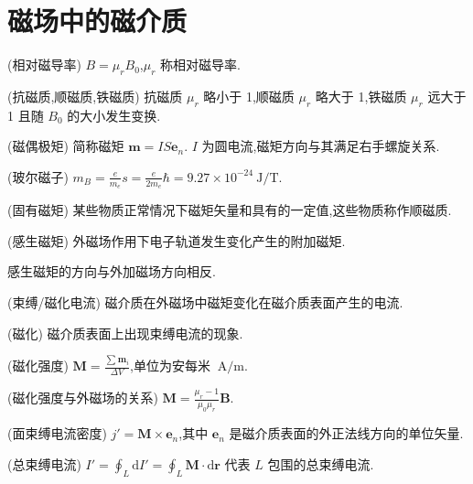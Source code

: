     \section{磁场中的磁介质}
    \begin{definition}
        (相对磁导率) $B=\mu_{r}B_0$,$\mu_{r}$ 称相对磁导率.
    \end{definition}
    \begin{definition}
        (抗磁质,顺磁质,铁磁质) 抗磁质 $\mu_{r}$ 略小于 1,顺磁质 $\mu_{r}$ 略大于 1,铁磁质 $\mu_{r}$ 远大于 1 且随 $B_0$ 的大小发生变换.
    \end{definition}
    \begin{definition}
        (磁偶极矩) 简称磁矩 $\bm{m}=IS\bm{e}_{n}$. $I$ 为圆电流,磁矩方向与其满足右手螺旋关系.
    \end{definition}
    \begin{definition}
        (玻尔磁子) $m_{B}=\frac{e}{m_{e}}s=\frac{e}{2m_{e}}\hbar =9.27\times 10^{-24} \ \mathrm{J / T}$.
    \end{definition}
    \begin{definition}
        (固有磁矩) 某些物质正常情况下磁矩矢量和具有的一定值,这些物质称作顺磁质.
    \end{definition}
    \begin{definition}
        (感生磁矩) 外磁场作用下电子轨道发生变化产生的附加磁矩.
    \end{definition}
    感生磁矩的方向与外加磁场方向相反.
    \begin{definition}
        (束缚/磁化电流) 磁介质在外磁场中磁矩变化在磁介质表面产生的电流.
    \end{definition}
    \begin{definition}
        (磁化) 磁介质表面上出现束缚电流的现象.
    \end{definition}
    \begin{definition}
        (磁化强度) $\bm{M}=\frac{\sum_{}^{}\bm{m}_{i}}{\Delta V}$,单位为安每米 $\ \mathrm{A / m}$.
    \end{definition}
    \begin{theorem}
        (磁化强度与外磁场的关系) $\bm{M}=\frac{\mu_{r}-1}{\mu_0\mu_{r}}\bm{B}$.
    \end{theorem}
    \begin{theorem}
        (面束缚电流密度) $j'=\bm{M}\times \bm{e}_{n}$,其中 $\bm{e}_{n}$ 是磁介质表面的外正法线方向的单位矢量.
    \end{theorem}
    \begin{theorem}
        (总束缚电流) $I'=\oint_{L}^{}\mathrm{d}I'=\oint_{L}^{}\bm{M}\cdot \mathrm{d}\bm{r}$ 代表 $L$ 包围的总束缚电流.
    \end{theorem}
